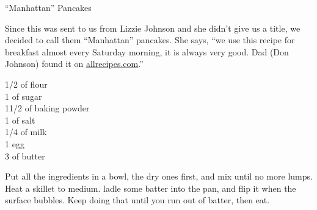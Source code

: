 \begin{entry}{``Manhattan'' Pancakes}

\begin{open}
  Since this was sent to us from Lizzie Johnson and she didn't give us a
  title, we decided to call them ``Manhattan'' pancakes. She says, ``we use
  this recipe for breakfast almost every Saturday morning, it is always very
  good. Dad (Don Johnson) found it on \url{allrecipes.com}.''
\end{open}
\begin{ingredients}
    \SI{1/2}{\cup} of flour\\
    \SI{1}{\tblspoon} of sugar\\
    1\SI{1/2}{\teaspoon} of baking powder\\
    \SI{1}{\teaspoon} of salt\\
    \SI{1/4}{\cup} of milk\\
    1 egg\\
    \SI{3}{\tblspoon} of butter
\end{ingredients}
Put all the ingredients in a bowl, the dry ones first, and mix until no more
lumps. Heat a skillet to medium. ladle some batter into the pan, and flip it
when the surface bubbles. Keep doing that until you run out of batter, then
eat.
\end{entry}

